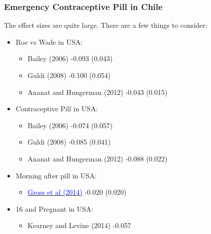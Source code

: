 \documentclass[10pt,letterpaper,subeqn]{beamer}
\begin{document}
\begin{frame}[label=empirA3]
  \frametitle{Emergency Contraceptive Pill in Chile}
The effect sizes are quite large.  There are a few things to consider:
\vspace{4mm}
\begin{itemize}
\item Roe vs Wade in USA:
\begin{itemize}
\item Bailey (2006) \hspace{4.4cm}-0.093 (0.043)
\item Guldi (2008)  \hspace{4.4cm} -0.100 (0.054)
\item Ananat and Hungerman (2012) \hspace{1.75cm} -0.043 (0.015)
\end{itemize}
\item Contraceptive Pill in USA:
\begin{itemize}
\item Bailey (2006) \hspace{4.4cm}-0.074 (0.057)
\item Guldi (2008)  \hspace{4.4cm} -0.085 (0.041)
\item Ananat and Hungerman (2012) \hspace{1.75cm} -0.088 (0.022)
\end{itemize}
\item Morning after pill in USA: 
\begin{itemize}
\item \hyperlink{GrossEtAl}{\textcolor{blue}{Gross et al (2014)}} \hspace{3.7cm} -0.020 (0.020)
\end{itemize}
\item 16 and Pregnant in USA: 
\begin{itemize}
\item Kearney and Levine (2014) \hspace{2.8cm} -0.057
\end{itemize}
\end{itemize}

\end{frame}
\end{document}
